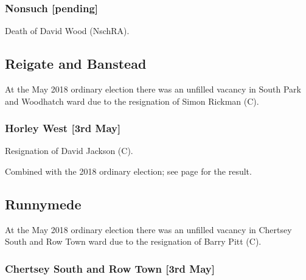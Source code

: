 \documentclass[a4paper,openany]{book}
\begin{document}
\begin{resultsiii}
\subsubsection*{Nonsuch \hspace*{\fill}\nolinebreak[1]%
\enspace\hspace*{\fill}
[pending]}


Death of David Wood (NschRA).

\subsection*{Reigate and Banstead}

At the May 2018 ordinary election there was an unfilled vacancy in South Park and Woodhatch ward due to the resignation of Simon Rickman (C).

\subsubsection*{Horley West \hspace*{\fill}\nolinebreak[1]%
\enspace\hspace*{\fill}
[3rd May]}


Resignation of David Jackson (C).

Combined with the 2018 ordinary election; see page \pageref{HorleyWestReigateBanstead} for the result.

\subsection*{Runnymede}

At the May 2018 ordinary election there was an unfilled vacancy in Chertsey South and Row Town ward due to the resignation of Barry Pitt (C).

\subsubsection*{Chertsey South and Row Town \hspace*{\fill}\nolinebreak[1]%
\enspace\hspace*{\fill}
[3rd May]}


\end{resultsiii}
\end{document}
